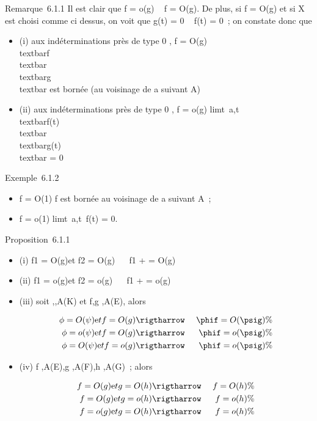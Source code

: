 Remarque~6.1.1 Il est clair que f = o(g) \rigtharrow~ f = O(g). De plus, si f =
O(g) et si X est choisi comme ci dessus, on voit que g(t) = 0 \rigtharrow~ f(t) =
0~; on constate donc que

\begin{itemize}
\itemsep1pt\parskip0pt
\item
  (i) aux indéterminations près de type  0  ,
  f = O(g) \Leftrightarrow
  \\textbar{}f\\textbar{}
  \over
  \\textbar{}g\\textbar{} est bornée (au
  voisinage de a suivant A)
\item
  (ii) aux indéterminations près de type  0  ,
  f = o(g) \Leftrightarrow
  limt\rightarrow~a,t\inA~
  \\textbar{}f(t)\\textbar{}
  \over
  \\textbar{}g(t)\\textbar{} = 0
\end{itemize}

Exemple~6.1.2

\begin{itemize}
\itemsep1pt\parskip0pt
\item
  f = O(1) \Leftrightarrow f est bornée au voisinage de a
  suivant A~;
\item
  f = o(1) \Leftrightarrow
  limt\rightarrow~a,t\inA~f(t) = 0.
\end{itemize}

Proposition~6.1.1

\begin{itemize}
\item
  (i) f1 = O(g)\text et f2 = O(g)
  \rigtharrow~ \alpha~f1 +  = O(g)
\item
  (ii) f1 = o(g)\text et f2 =
  o(g) \rigtharrow~ \alpha~f1 +  = o(g)
\item
  (iii) soit \phi,\psi {},A(K) et f,g ,A(E), alors

  \begin{align*} \phi = O(\psi)\text et
  f = O(g)& \rigtharrow~& \phif = O(\psig)\%& \\ \phi =
  o(\psi)\text et f = O(g)& \rigtharrow~& \phif = o(\psig) \%&
  \\ \phi = O(\psi)\text et f
  = o(g)& \rigtharrow~& \phif = o(\psig) \%& \\
  \end{align*}
\item
  (iv) f ,A(E),g ,A(F),h ,A(G)~;
  alors

  \begin{align*} f = O(g)\text et
  g = O(h)& \rigtharrow~& f = O(h)\%& \\ f =
  O(g)\text et g = o(h)& \rigtharrow~& f = o(h) \%&
  \\ f = o(g)\text et g
  = O(h)& \rigtharrow~& f = o(h) \%& \\
  \end{align*}
\end{itemize}

